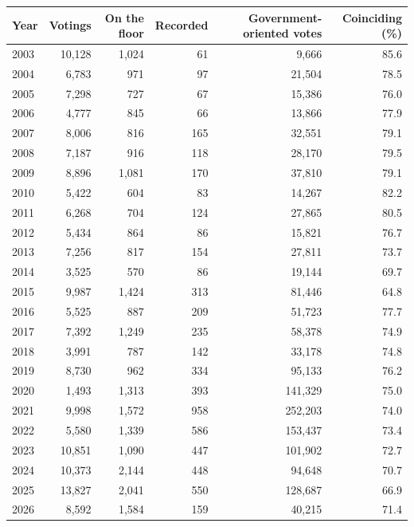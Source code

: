 \begin{tabular}{@{}lrrrrr@{}}
\toprule
Year & Votings & On the floor & Recorded & Government-oriented votes & Coinciding (\%) \\
\midrule
2003 & 10,128 & 1,024 & 61 & 9,666 & 85.6 \\
2004 & 6,783 & 971 & 97 & 21,504 & 78.5 \\
2005 & 7,298 & 727 & 67 & 15,386 & 76.0 \\
2006 & 4,777 & 845 & 66 & 13,866 & 77.9 \\
2007 & 8,006 & 816 & 165 & 32,551 & 79.1 \\
2008 & 7,187 & 916 & 118 & 28,170 & 79.5 \\
2009 & 8,896 & 1,081 & 170 & 37,810 & 79.1 \\
2010 & 5,422 & 604 & 83 & 14,267 & 82.2 \\
2011 & 6,268 & 704 & 124 & 27,865 & 80.5 \\
2012 & 5,434 & 864 & 86 & 15,821 & 76.7 \\
2013 & 7,256 & 817 & 154 & 27,811 & 73.7 \\
2014 & 3,525 & 570 & 86 & 19,144 & 69.7 \\
2015 & 9,987 & 1,424 & 313 & 81,446 & 64.8 \\
2016 & 5,525 & 887 & 209 & 51,723 & 77.7 \\
2017 & 7,392 & 1,249 & 235 & 58,378 & 74.9 \\
2018 & 3,991 & 787 & 142 & 33,178 & 74.8 \\
2019 & 8,730 & 962 & 334 & 95,133 & 76.2 \\
2020 & 1,493 & 1,313 & 393 & 141,329 & 75.0 \\
2021 & 9,998 & 1,572 & 958 & 252,203 & 74.0 \\
2022 & 5,580 & 1,339 & 586 & 153,437 & 73.4 \\
2023 & 10,851 & 1,090 & 447 & 101,902 & 72.7 \\
2024 & 10,373 & 2,144 & 448 & 94,648 & 70.7 \\
2025 & 13,827 & 2,041 & 550 & 128,687 & 66.9 \\
2026 & 8,592 & 1,584 & 159 & 40,215 & 71.4 \\
\bottomrule
\end{tabular}
